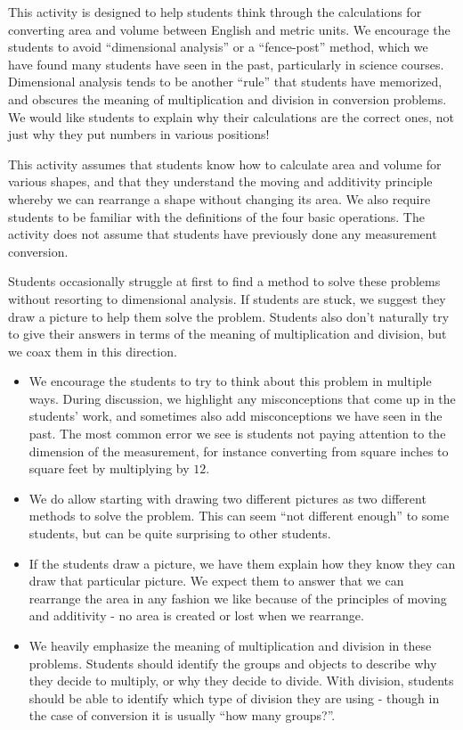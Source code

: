 \documentclass{ximera}
\begin{document}
\newpage
\begin{instructorNotes}

This activity is designed to help students think through the calculations for converting area and volume between English and metric units.  We encourage the students to avoid ``dimensional analysis'' or a ``fence-post'' method, which we have found many students have seen in the past, particularly in science courses.  Dimensional analysis tends to be another ``rule'' that students have memorized, and obscures the meaning of multiplication and division in conversion problems.  We would like students to explain why their calculations are the correct ones, not just why they put numbers in various positions!

This activity assumes that students know how to calculate area and volume for various shapes, and that they understand the moving and additivity principle whereby we can rearrange a shape without changing its area.  We also require students to be familiar with the definitions of the four basic operations. The activity does not assume that students have previously done any measurement conversion.

Students occasionally struggle at first to find a method to solve these problems without resorting to dimensional analysis.  If students are stuck, we suggest they draw a picture to help them solve the problem.  Students also don't naturally try to give their answers in terms of the meaning of multiplication and division, but we coax them in this direction.
\begin{itemize}
	\item We encourage the students to try to think about this problem in multiple ways.  During discussion, we highlight any misconceptions that come up in the students' work, and sometimes also add misconceptions we have seen in the past.  The most common error we see is students not paying attention to the dimension of the measurement, for instance converting from square inches to square feet by multiplying by $12$.
	\item We do allow starting with drawing two different pictures as two different methods to solve the problem.  This can seem ``not different enough'' to some students, but can be quite surprising to other students.
	\item If the students draw a picture, we have them explain how they know they can draw that particular picture.  We expect them to answer that we can rearrange the area in any fashion we like because of the principles of moving and additivity - no area is created or lost when we rearrange. 
	\item We heavily emphasize the meaning of multiplication and division in these problems.  Students should identify the groups and objects to describe why they decide to multiply, or why they decide to divide.  With division, students should be able to identify which type of division they are using - though in the case of conversion it is usually ``how many groups?''.
\end{itemize}





\end{instructorNotes}
\end{document}
